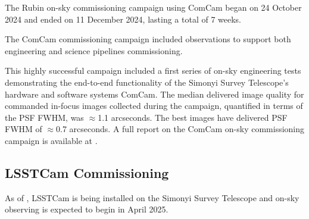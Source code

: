 The Rubin on-sky commissioning campaign using ComCam began on 24 October 2024 and ended on 11 December 2024, lasting a total of 7 weeks. 

The ComCam commissioning campaign included observations to support both engineering and science pipelines commissioning.


This highly successful campaign included a first series of on-sky engineering tests demonstrating the end-to-end functionality of the Simonyi Survey Telescope’s hardware and software systems ComCam.
The median delivered image quality  for commanded in-focus images collected during the campaign, quantified in terms of the PSF FWHM, was $\approx$1.1 arcseconds. 
The best images have delivered PSF FWHM of $\approx$0.7 arcseconds.
A full report on the ComCam on-sky commissioning campaign is available at .


\subsection{LSSTCam Commissioning }
\label{ssec:commissioning-lsstcam}

As of \currentdate, LSSTCam is being installed on the Simonyi Survey Telescope and on-sky observing is expected to begin in April 2025.

